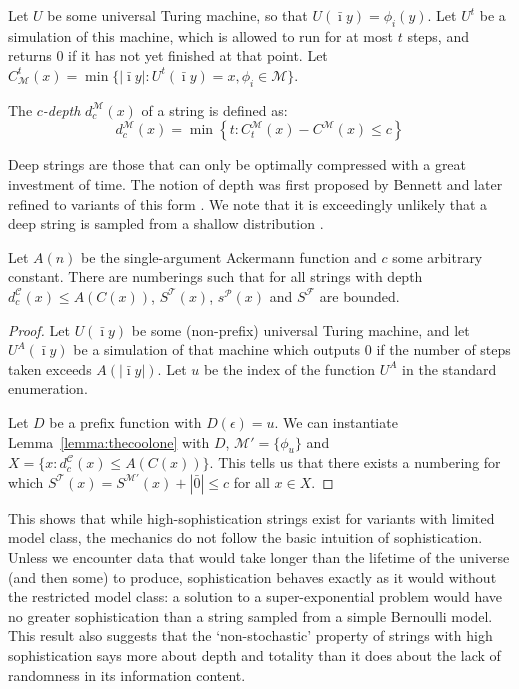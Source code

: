 \documentclass{style/llncs}
\newcommand{\M}{\mathscr M}
\newcommand{\C}{\mathscr C}
\newcommand{\T}{\mathscr T}
\newcommand{\F}{\mathscr F}
\renewcommand{\P}{\mathscr P}
\newcommand{\s}{S}
\begin{document}
\begin{definition}[depth]\belowdisplayskip=-12pt
Let $U$ be some universal Turing machine, so that $U(\bar\imath y) = \phi_i(y)$. Let $U^t$ be a simulation of this machine, which is allowed to run for at most $t$ steps, and returns $0$ if it has not yet finished at that point. Let $C^t_\M(x) = \min\{|\bar\imath y| : U^t(\bar\imath y) = x, \phi_i \in \M\}$.

The \emph{$c$-depth} $d^\M_c(x)$ of a string is defined as:
\[
	d^\M_c(x) = \min \left\{t : C^\M_t(x) - C^\M(x) \leq c \right\}
\] 
\end{definition}
Deep strings are those that can only be optimally compressed with a great investment of time. The notion of depth was first proposed by Bennett \cite{bennett1988logical} and later refined to variants of this form \cite{antunes2006computational}. We note that it is exceedingly unlikely that a deep string is sampled from a shallow distribution \cite{bloem2014safe,bennett1988logical}.
 
\begin{theorem}
Let $A(n)$ be the single-argument Ackermann function and $c$ some arbitrary constant. There are numberings such that for all strings with depth $d^\C_c(x) \leq A(C(x))$, $\s^\T(x)$, $s^\P(x)$ and $\s^\F$ are bounded.
\end{theorem}
\begin{proof}
Let $U(\bar\imath y)$ be some (non-prefix) universal Turing machine, and let $U^A(\bar\imath y)$ be a simulation of that machine which outputs $0$ if the number of steps taken exceeds $A(|\bar\imath y|)$. Let $u$ be the index of the function $U^A$ in the standard enumeration.

Let $D$ be a prefix function with $D(\epsilon) = u$. We can instantiate Lemma~\ref{lemma:thecoolone} with $D$, $\M' = \{\phi_u\}$ and $X = \{x : d^\C_c(x) \leq A(C(x))\}$. This tells us that there exists a numbering for which $\s^\T(x) = \s^{\M'}(x) + |\bar0| \leq c$ for all $x \in X$.
\end{proof}

This shows that while high-sophistication strings exist for variants with limited model class, the mechanics do not follow the basic intuition of sophistication. Unless we encounter data that would take longer than the lifetime of the universe (and then some) to produce, sophistication behaves exactly as it would without the restricted model class: a solution to a super-exponential problem would have no greater sophistication than a string sampled from a simple Bernoulli model. This result also suggests that the `non-stochastic' property of strings with high sophistication \cite{shen1983concept,vereshchagin2004kolmogorov} says more about depth and totality than it does about the lack of randomness in its information content.
\end{document}
